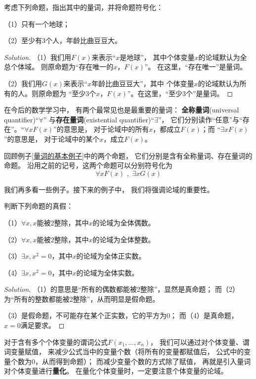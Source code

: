 \begin{example}考虑下列命题，指出其中的量词，并将命题符号化：

（1）只有一个地球；

（2）至少有3个人，年龄比曲豆豆大。
\end{example}

\begin{proof}[Solution]
（1）我们用$F(x)$来表示“$x$是地球”，
其中个体变量$x$的论域默认为全总个体域。
则原命题为“存在唯一的$x$，$F(x)$”。
在这里，“存在唯一”是量词。

（2）我们用$G(x)$来表示“$x$年龄比曲豆豆大”，其中
个体变量$x$的论域默认为所有的人。则原命题为
“至少3个$x$，$F(x)$”。在这里，“至少3个”是量词。
\end{proof}

在今后的数学学习中，
有两个最常见也是最重要的量词：
\textbf{全称量词}(universal quantifier)“$\forall$”
与\textbf{存在量词}(existential quantifier)“$\exists$”，
它们分别读作“任意”与“存在”。“$\forall xF(x)$”的意思是，
对于论域中的所有$x$，都成立$F(x)$；而
“$\exists xF(x)$”的意思是，
对于论域中的某个$x$，成立$F(x)$。

回顾例子\ref{量词的基本例子}中的两个命题，
它们分别是含有全称量词、存在量词的命题。
沿用之前的记号，这两个命题可以分别符号化为
$$\forall xF(x)\,\,,\,\,\exists xG(x)$$

我们再多看一些例子。接下来的例子中，
我们将强调论域的重要性。

\begin{example}判断下列命题的真假：

（1）$\forall x,x$能被2整除，其中$x$的论域为全体偶数。

（2）$\forall x,x$能被2整除，其中$x$的论域为全体整数。

（3）$\exists x, x^2=0$，其中$x$的论域为全体正实数。

（4）$\exists x, x^2=0$，其中$x$的论域为全体实数。
\end{example}

\begin{proof}[Solution]
（1）的意思是“所有的偶数都能被2整除”，显然是真命题；
而（2）为“所有的整数都能被2整除”，从而明显是假命题。

（3）是假命题，不可能存在某个正实数，它的平方为0；
而（4）是真命题，$x=0$满足要求。
\end{proof}

对于含有多个个体变量的谓词公式$F(x_1,...,x_n)$，
我们可以通过对个体变量、谓词变量赋值，
来减少公式当中的变量个数（将所有的变量都赋值后，
公式中的变量个数为0，从而得到命题）；
而减少变量个数的方式除了赋值，
再就是引入量词对个体变量进行\textbf{量化}。
在量化个体变量时，一定要注意个体变量的论域。

